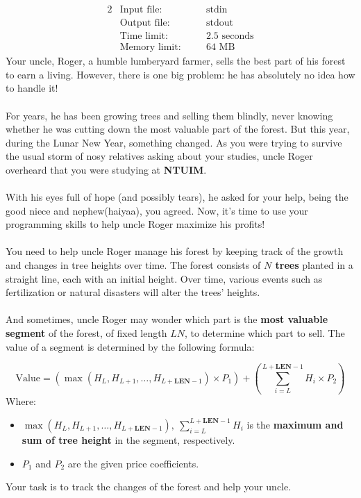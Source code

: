 \documentclass[12pt,a4paper]{article}
\begin{document}
\begin{alignat*} {2}
 &   \text{Input file:}   \quad     &&\text{stdin}\\
 &   \text{Output file:}  \quad     &&\text{stdout}\\
 &   \text{Time limit:}   \quad     &&\text{2.5 seconds}\\
 &   \text{Memory limit:} \quad     &&\text{64 MB}
\end{alignat*}
\noindent
Your uncle, Roger, a humble lumberyard farmer, sells the best part of his forest to earn a living. However, there is one big problem: he has absolutely no idea how to handle it! 
\\\\
\noindent
For years, he has been growing trees and selling them blindly, never knowing whether he was cutting down the most valuable part of the forest. But this year, during the Lunar New Year, something changed. As you were trying to survive the usual storm of nosy relatives asking about your studies, uncle Roger overheard that you were studying at \textbf{NTUIM}.  
\\\\
\noindent
With his eyes full of hope (and possibly tears), he asked for your help, being the good niece and nephew(haiyaa), you agreed. Now, it's time to use your programming skills to help uncle Roger maximize his profits!
\\\\
\noindent
You need to help uncle Roger manage his forest by keeping track of the growth and changes in tree heights over time. The forest consists of \textbf{\(N\) trees} planted in a straight line, each with an initial height. Over time, various events such as fertilization or natural disasters will alter the trees' heights.
\\\\
\noindent
And sometimes, uncle Roger may wonder which part is the \textbf{most valuable segment} of the forest, of fixed length \textbf{\(LN\)}, to determine which part to sell. The value of a segment is determined by the following formula:

\[
\text{Value} = (\max(H_L, H_{L+1}, \dots, H_{L+\textbf{LEN}-1}) \times P_1) + (\sum_{i=L}^{L+\textbf{LEN}-1} H_i \times P_2)
\]
\noindent
Where:
\begin{itemize}
    \item \( \max(H_L, H_{L+1}, \dots, H_{L+\textbf{LEN}-1}),\ \sum_{i=L}^{L+\textbf{LEN}-1} H_i \) is the \textbf{maximum and sum of tree height} in the segment, respectively.
    \item \( P_1 \) and \( P_2 \) are the given price coefficients.
\end{itemize}
\noindent
Your task is to track the changes of the forest and help your uncle.
\end{document}
